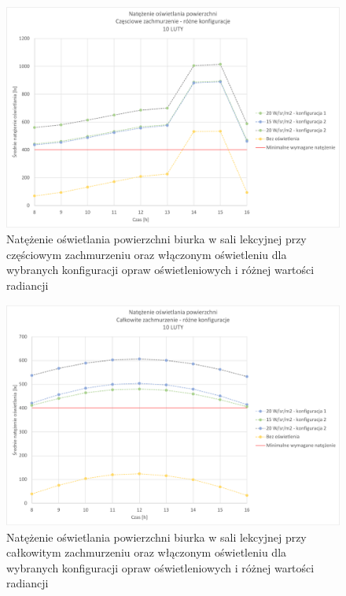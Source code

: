 \documentclass[a4paper,12pt]{article}
\begin{document}
	\begin{figure}[!ht]
		\centering
		\includegraphics[width=\linewidth]{Wykresy/oswietlenie_czesciowe_zachmurzenie_rozne_konfiguracje.pdf}
		\caption{Natężenie oświetlania powierzchni biurka w sali lekcyjnej przy częściowym zachmurzeniu  oraz włączonym oświetleniu dla wybranych konfiguracji opraw oświetleniowych i różnej wartości radiancji}
		\label{oswietlenie_czesciowe_zachmurzenie_rozne_konfiguracje}
	\end{figure}

	\begin{figure}[!ht]
		\centering
		\includegraphics[width=\linewidth]{Wykresy/oswietlenie_calkowite_zachmurzenie_rozne_konfiguracje.pdf}
		\caption{Natężenie oświetlania powierzchni biurka w sali lekcyjnej przy całkowitym zachmurzeniu  oraz włączonym oświetleniu dla wybranych konfiguracji opraw oświetleniowych i różnej wartości radiancji}
		\label{oswietlenie_calkowite_zachmurzenie_rozne_konfiguracje}
	\end{figure}	
\end{document}
